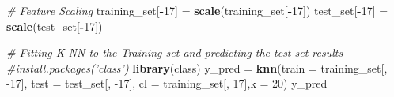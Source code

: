 \documentclass[
]{article}
\newenvironment{Shaded}{\begin{snugshade}}{\end{snugshade}}
\newcommand{\CommentTok}[1]{\textcolor[rgb]{0.56,0.35,0.01}{\textit{#1}}}
\newcommand{\DataTypeTok}[1]{\textcolor[rgb]{0.13,0.29,0.53}{#1}}
\newcommand{\DecValTok}[1]{\textcolor[rgb]{0.00,0.00,0.81}{#1}}
\newcommand{\KeywordTok}[1]{\textcolor[rgb]{0.13,0.29,0.53}{\textbf{#1}}}
\newcommand{\NormalTok}[1]{#1}
\newcommand{\OperatorTok}[1]{\textcolor[rgb]{0.81,0.36,0.00}{\textbf{#1}}}
\newcommand{\StringTok}[1]{\textcolor[rgb]{0.31,0.60,0.02}{#1}}
\begin{document}
\begin{Shaded}
\begin{Highlighting}[]
\CommentTok{# Feature Scaling}
\NormalTok{training_set[}\OperatorTok{-}\DecValTok{17}\NormalTok{] =}\StringTok{ }\KeywordTok{scale}\NormalTok{(training_set[}\OperatorTok{-}\DecValTok{17}\NormalTok{])}
\NormalTok{test_set[}\OperatorTok{-}\DecValTok{17}\NormalTok{] =}\StringTok{ }\KeywordTok{scale}\NormalTok{(test_set[}\OperatorTok{-}\DecValTok{17}\NormalTok{])}

\CommentTok{# Fitting K-NN to the Training set and predicting the test set results}
\CommentTok{#install.packages('class')}
\KeywordTok{library}\NormalTok{(class)}
\NormalTok{y_pred =}\StringTok{ }\KeywordTok{knn}\NormalTok{(}\DataTypeTok{train =}\NormalTok{ training_set[, }\DecValTok{-17}\NormalTok{],}
             \DataTypeTok{test =}\NormalTok{ test_set[, }\DecValTok{-17}\NormalTok{],}
             \DataTypeTok{cl =}\NormalTok{ training_set[, }\DecValTok{17}\NormalTok{],}\DataTypeTok{k =} \DecValTok{20}\NormalTok{)}
\NormalTok{y_pred}
\end{Highlighting}
\end{Shaded}
\end{document}

